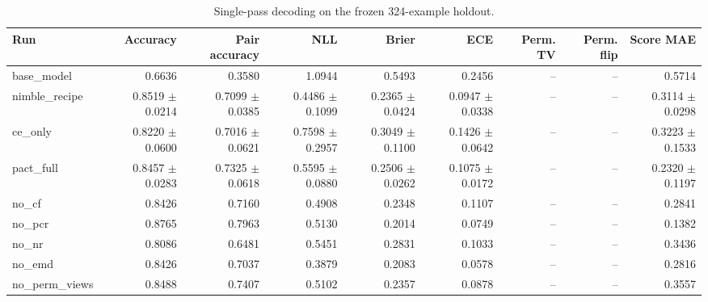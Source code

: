 \begin{table}[t]
\centering
\begin{tabular}{lrrrrrrrr}
\toprule
Run & Accuracy & Pair accuracy & NLL & Brier & ECE & Perm. TV & Perm. flip & Score MAE \\
\midrule
base\_model & 0.6636 & 0.3580 & 1.0944 & 0.5493 & 0.2456 & -- & -- & 0.5714 \\
nimble\_recipe & 0.8519 $\pm$ 0.0214 & 0.7099 $\pm$ 0.0385 & 0.4486 $\pm$ 0.1099 & 0.2365 $\pm$ 0.0424 & 0.0947 $\pm$ 0.0338 & -- & -- & 0.3114 $\pm$ 0.0298 \\
ce\_only & 0.8220 $\pm$ 0.0600 & 0.7016 $\pm$ 0.0621 & 0.7598 $\pm$ 0.2957 & 0.3049 $\pm$ 0.1100 & 0.1426 $\pm$ 0.0642 & -- & -- & 0.3223 $\pm$ 0.1533 \\
pact\_full & 0.8457 $\pm$ 0.0283 & 0.7325 $\pm$ 0.0618 & 0.5595 $\pm$ 0.0880 & 0.2506 $\pm$ 0.0262 & 0.1075 $\pm$ 0.0172 & -- & -- & 0.2320 $\pm$ 0.1197 \\
no\_cf & 0.8426 & 0.7160 & 0.4908 & 0.2348 & 0.1107 & -- & -- & 0.2841 \\
no\_pcr & 0.8765 & 0.7963 & 0.5130 & 0.2014 & 0.0749 & -- & -- & 0.1382 \\
no\_nr & 0.8086 & 0.6481 & 0.5451 & 0.2831 & 0.1033 & -- & -- & 0.3436 \\
no\_emd & 0.8426 & 0.7037 & 0.3879 & 0.2083 & 0.0578 & -- & -- & 0.2816 \\
no\_perm\_views & 0.8488 & 0.7407 & 0.5102 & 0.2357 & 0.0878 & -- & -- & 0.3557 \\
\bottomrule
\end{tabular}
\caption{Single-pass decoding on the frozen 324-example holdout.}
\label{tab:main}
\end{table}

